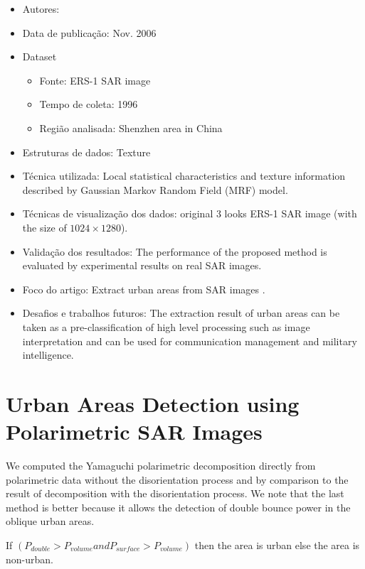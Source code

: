 \documentclass[paper=a4, fontsize=11pt]{scrartcl}
\begin{document}
\begin{itemize}
    \item Autores:~\cite{xia2006urban}
    \item Data de publicação: Nov. 2006
    \item Dataset
    \begin{itemize}
        \item Fonte: ERS-1 SAR image
        \item Tempo de coleta: 1996
        \item Região analisada: Shenzhen area in China
    \end{itemize}
    \item Estruturas de dados: Texture
    \item Técnica utilizada: Local statistical characteristics and texture information described by Gaussian Markov Random Field (MRF) model.
    \item Técnicas de visualização dos dados: original 3 looks ERS-1 SAR image (with the size of $1024 \times 1280$).
    \item Validação dos resultados: The performance of the proposed method is evaluated by experimental results on real SAR images.
    \item Foco do artigo: Extract urban areas from SAR images .
    \item Desafios e trabalhos futuros: The extraction result of urban areas can be taken as a pre-classification of high level processing such as image interpretation and can be used for communication management and military intelligence. 
\end{itemize}

\newpage

\section*{Urban Areas Detection using Polarimetric SAR Images}

We computed the Yamaguchi polarimetric decomposition directly from polarimetric data without the disorientation process and by comparison to the result of decomposition with the disorientation process. 
We note that the last method is better because it allows the detection of double bounce power in the oblique urban areas.

If $(P_{double} > P_{volume} and P_{surface} > P_{volume})$ then the area is urban else the area is non-urban.
\end{document}
